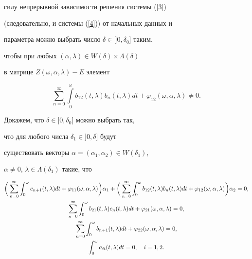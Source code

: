 \begin{pf}
силу непрерывной зависимости решения системы (\ref{3})


(следовательно, и системы (\ref{4})) от начальных данных и


параметра можно выбрать число $\delta \in\,]0,\delta_0]$ таким,


чтобы при любых $(\alpha,\lambda) \in W(\delta) \times \Lambda (\delta)$


в матрице $Z(\omega,\alpha,\lambda) - E$ элемент


$$


\sum_{n=0}^\infty \int\limits_0^\omega b_{12}(t,\lambda)b_n


(t,\lambda)dt+\varphi_{12} (\omega,\alpha,\lambda) \ne 0.


$$





Докажем, что $\delta \in]0,\delta_0]$ можно выбрать так,


что для любого числа $\delta_1 \in]0,\delta]$ будут


существовать векторы $\alpha=(\alpha_1,\alpha_2) \in W(\delta_1)$,


$\alpha \ne 0$, $\lambda \in \Lambda (\delta_1)$ такие, что


\begin{gather}


\bigg(\sum_{n=0}^\infty \int_0^\omega c_{n+1} (t,\lambda)dt+


\varphi_{11} (\omega,\alpha,\lambda)\bigg)\alpha_1+


\bigg(\sum_{n=0}^\infty


\int_0^\omega b_{12} (t,\lambda)b_n (t,\lambda)dt+\varphi_{12} (\omega,


\alpha,\lambda)\bigg)\alpha_2 =0,\notag \\


%


\label{9}


\sum_{n=0}^\infty \int_0^\omega b_{21} (t,\lambda)c_n (t,\lambda)dt


+\varphi_{21} (\omega,\alpha,\lambda)=0,\\


%


\sum_{n=0}^\infty \int_0^\omega b_{n+1} (t,\lambda)dt+


\varphi_{22} (\omega,\alpha,\lambda)=0,\notag \\


%


\int_0^\omega a_{ii} (t,\lambda)dt =0,\quad i=1,2.\notag



\end{gather}
\end{pf}
